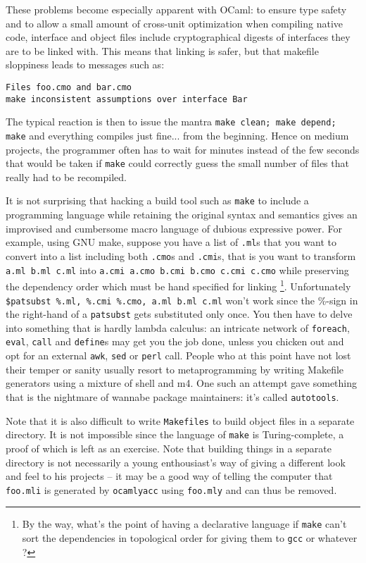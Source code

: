 \documentclass[12pt]{article}
\begin{document}
These problems become especially apparent with OCaml: to ensure type safety and
to allow a small amount of cross-unit optimization when compiling native code,
interface and object files include cryptographical digests of interfaces they
are to be linked with.  This means that linking is safer, but that makefile sloppiness
leads to messages such as:
\begin{verbatim}
Files foo.cmo and bar.cmo
make inconsistent assumptions over interface Bar
\end{verbatim}

The typical reaction is then to issue the mantra \texttt{make clean; make
depend; make} and everything compiles just fine... from the beginning.  Hence
on medium projects, the programmer often has to wait for minutes instead of the
few seconds that would be taken if \texttt{make} could correctly guess the
small number of files that really had to be recompiled.

It is not surprising that hacking a build tool such as \texttt{make} to include
a programming language while retaining the original syntax and semantics gives
an improvised and cumbersome macro language of dubious expressive power.  For
example, using GNU make, suppose you have a list of \texttt{.ml}s that you want
to convert into a list including both \texttt{.cmo}s and \texttt{.cmi}s, that
is you want to transform \texttt{a.ml b.ml c.ml} into \texttt{a.cmi a.cmo b.cmi
b.cmo c.cmi c.cmo} while preserving the dependency order which must be hand
specified for linking \footnote{By the way, what's the point of having a
declarative language if \texttt{make} can't sort the dependencies in
topological order for giving them to \texttt{gcc} or whatever ?}.
Unfortunately \texttt{\$patsubst \%.ml, \%.cmi \%.cmo, a.ml b.ml c.ml} won't
work since the \%-sign in the right-hand of a \texttt{patsubst} gets
substituted only once.  You then have to delve into something that is hardly
lambda calculus: an intricate network of \texttt{foreach}, \texttt{eval},
\texttt{call} and \texttt{define}s may get you the job done, unless you chicken
out and opt for an external \texttt{awk}, \texttt{sed} or \texttt{perl} call.
People who at this point have not lost their temper or sanity usually resort to
metaprogramming by writing Makefile generators using a mixture of shell and m4.
One such an attempt gave something that is the nightmare of wannabe package
maintainers: it's called \texttt{autotools}.

Note that it is also difficult to write \texttt{Makefiles} to build object
files in a separate directory.  It is not impossible since the language of
\texttt{make} is Turing-complete, a proof of which is left as an exercise.
Note that building things in a separate directory is not necessarily a young
enthousiast's way of giving a different look and feel to his projects -- it may
be a good way of telling the computer that \texttt{foo.mli} is generated by
\texttt{ocamlyacc} using \texttt{foo.mly} and can thus be removed.
\end{document}
